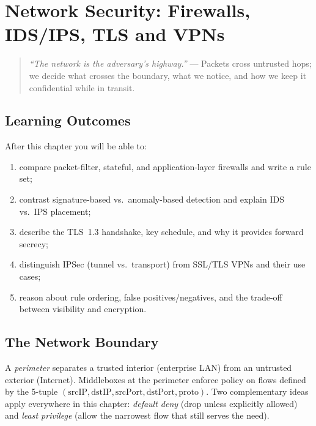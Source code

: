 \chapter{Network Security: Firewalls, IDS/IPS, TLS and VPNs}
\label{ch:network}
\begin{quote}
\emph{``The network is the adversary's highway.''} --- Packets cross untrusted hops; we decide what crosses the boundary, what we notice, and how we keep it confidential while in transit.
\end{quote}

\noindent{}

\section*{Learning Outcomes}
After this chapter you will be able to:
\begin{enumerate}[label=(L\arabic*)]
    \item compare packet-filter, stateful, and application-layer firewalls and write a rule set;
    \item contrast signature-based vs.\ anomaly-based detection and explain IDS vs.\ IPS placement;
    \item describe the TLS~1.3 handshake, key schedule, and why it provides forward secrecy;
    \item distinguish IPSec (tunnel vs.\ transport) from SSL/TLS VPNs and their use cases;
    \item reason about rule ordering, false positives/negatives, and the trade-off between visibility and encryption.
\end{enumerate}

\section{The Network Boundary}
\label{sec:network-boundary}
A \emph{perimeter} separates a trusted interior (enterprise LAN) from an untrusted exterior (Internet). Middleboxes at the perimeter enforce policy on flows defined by the 5-tuple \((\text{srcIP},\text{dstIP},\text{srcPort},\text{dstPort},\text{proto})\). Two complementary ideas apply everywhere in this chapter: \emph{default deny} (drop unless explicitly allowed) and \emph{least privilege} (allow the narrowest flow that still serves the need).

